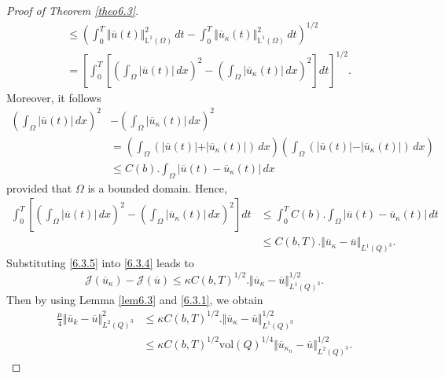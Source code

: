 \documentclass[10pt,a4paper]{amsart}
\begin{document}
\begin{proof}[Proof of Theorem \ref{theo6.3}]
\begin{align*}
			&\leq \left( \int_0^T \Vert \overline{u}(t) \Vert_{\mathbb{L}^1(\Omega)}^2 \, dt - \int_0^T \Vert \overline{u}_{\kappa}(t) \Vert_{\mathbb{L}^1(\Omega)}^2 \, dt \right)^{1/2} \\
			&= \left[\int_0^T  \left[  \left( \int_{\Omega} |\overline{u}(t)| \, dx \right)^2 - \left(\int_{\Omega} \vert \overline{u}_{\kappa}(t) \vert \, dx \right)^2\right]dt \right]^{1/2}.
		\end{align*}
		Moreover, it follows
		\begin{align*}
			\left( \int_{\Omega} |\overline{u}(t)| \, dx \right)^2 &- \left(\int_{\Omega} \vert \overline{u}_{\kappa}(t) \vert \, dx \right)^2 \\
			&= \left( \int_{\Omega} (\vert \overline{u}(t) \vert + \vert \overline{u}_{\kappa}(t) \vert) \, dx \right) \left( \int_{\Omega} (\vert \overline{u}(t) \vert - \vert \overline{u}_{\kappa}(t) \vert) \, dx \right) \\
			&\leq C(b). \int_{\Omega} \vert \overline{u}(t) - \overline{u}_{\kappa}(t)\vert \, dx
		\end{align*}
		provided that $\Omega$ is a bounded domain.
		Hence, 
		\begin{equation} \label{6.3.5}
			\begin{aligned}
				\int_0^T  \left[  \left( \int_{\Omega} |\overline{u}(t)| \, dx \right)^2 - \left(\int_{\Omega} \vert \overline{u}_{\kappa}(t) \vert \, dx \right)^2\right]dt &\le \int_0^T C(b). \int_{\Omega} \vert \overline{u}(t) - \overline{u}_{\kappa}(t)\vert \, dt \\
				&\le C(b,T).\Vert \overline{u}_{\kappa} - \overline{u}\Vert_{L^1(Q)^3}. 
			\end{aligned}
		\end{equation}
		Substituting \eqref{6.3.5} into \eqref{6.3.4} leads to
		\begin{equation}
			\mathcal{J}(\overline{u}_{\kappa}) - \mathcal{J}(\overline{u}) \leq \kappa C(b,T)^{1/2}.\Vert \overline{u}_{\kappa} - \overline{u}\Vert_{L^1(Q)^3}^{1/2}.
		\end{equation}
		Then by using Lemma \ref{lem6.3} and \eqref{6.3.1}, we obtain
		\begin{align*}
			\frac{\mu}{4} \Vert \overline{u}_k - \overline{u} \Vert_{L^2(Q)^3}^2 &\leq \kappa C(b,T)^{1/2}.\Vert \overline{u}_{\kappa} - \overline{u}\Vert_{L^1(Q)^3}^{1/2} \\
			&\leq \kappa C(b, T)^{1/2} \text{vol}(Q)^{1/4} \Vert \overline{u}_{\kappa_n}- \overline{u} \Vert_{L^2(Q)^3}^{1/2}.
		\end{align*}

\end{proof}
\end{document}
